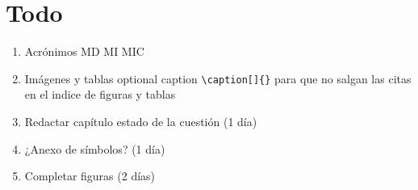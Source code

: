 \documentclass[final, 12pt, oneside]{class_diss}
\begin{document}
\section*{Todo}
\begin{enumerate}
  \item Acrónimos MD MI MIC
  \item Imágenes y tablas optional caption \texttt{\textbackslash caption[]\{\}} para que no salgan las citas en el indice de figuras y tablas
  \item Redactar capítulo estado de la cuestión (1 día)
  \item ¿Anexo de símbolos? (1 día)
  \item Completar figuras (2 días)
\end{enumerate}

\setcounter{page}{-1}







\vfill

\newpage
{}
\setcounter{page}{1}

{}

\tableofcontents
\listoffigures
\listoftables

\newpage
{}
\setcounter{page}{1}




% 
% 

% 


\nocite{*}



\appendix

\end{document}
